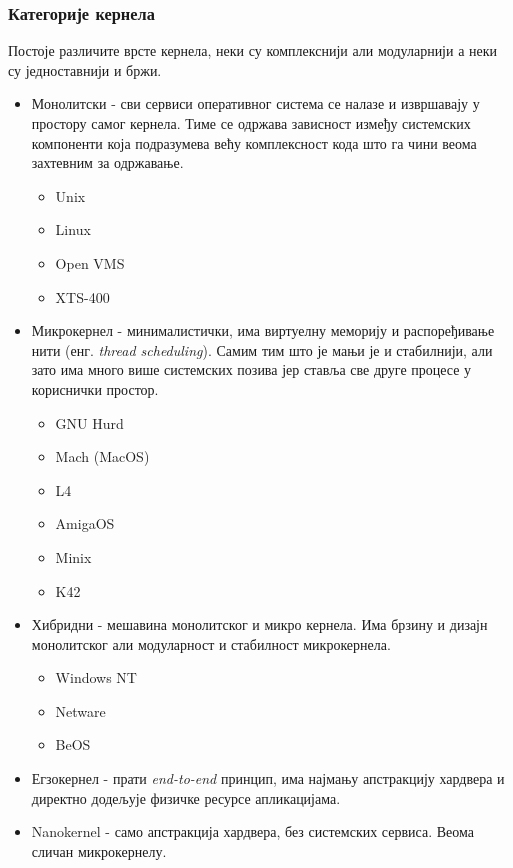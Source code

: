 \documentclass[a4paper,14pt]{article}
\begin{document}
\subsubsection{Категорије кернела}
Постоје различите врсте кернела\cite{kernelcats}, неки су комплекснији али модуларнији а неки су једноставнији и бржи.
\begin{itemize}
\item Монолитски - сви сервиси оперативног система се налазе и извршавају у простору самог кернела. Тиме се одржава зависност између системских компоненти која подразумева већу комплексност кода што га чини веома захтевним за одржавање.
\begin{itemize}
\item Unix
\item Linux
\item Open VMS
\item XTS-400
\end{itemize}
\item Микрокернел - минималистички, има виртуелну меморију и распоређивање нити (енг. \textit{thread scheduling}). Самим тим што је мањи је и стабилнији, али зато има много више системских позива јер ставља све друге процесе у кориснички простор.
\begin{itemize}
\item GNU Hurd
\item Mach (MacOS)
\item L4
\item AmigaOS
\item Minix
\item K42
\end{itemize}
\item Хибридни - мешавина монолитског и микро кернела. Има брзину и дизајн монолитског али модуларност и стабилност микрокернела.
\begin{itemize}
\item Windows NT
\item Netware
\item BeOS
\end{itemize}
\item Егзокернел - прати \textit{end-to-end} принцип, има најмању апстракцију хардвера и директно додељује физичке ресурсе апликацијама.
\item Nanokernel - само апстракција хардвера, без системских сервиса. Веома сличан микрокернелу.
\end{itemize}
\newpage
\end{document}
